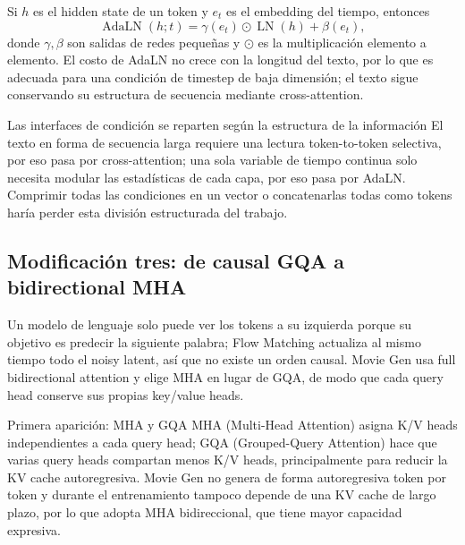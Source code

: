 
Si $h$ es el hidden state de un token y $e_t$ es el embedding del tiempo, entonces
\[
\operatorname{AdaLN}(h;t)
=\gamma(e_t)\odot\operatorname{LN}(h)+\beta(e_t),
\]
donde $\gamma,\beta$ son salidas de redes pequeñas y $\odot$ es la multiplicación elemento a elemento. El costo de AdaLN no crece con la longitud del texto, por lo que es adecuada para una condición de timestep de baja dimensión; el texto sigue conservando su estructura de secuencia mediante cross-attention.

\begin{importantbox}{Las interfaces de condición se reparten según la estructura de la información}
El texto en forma de secuencia larga requiere una lectura token-to-token selectiva, por eso pasa por cross-attention; una sola variable de tiempo continua solo necesita modular las estadísticas de cada capa, por eso pasa por AdaLN. Comprimir todas las condiciones en un vector o concatenarlas todas como tokens haría perder esta división estructurada del trabajo.
\end{importantbox}

\subsection{Modificación tres: de causal GQA a bidirectional MHA}

Un modelo de lenguaje solo puede ver los tokens a su izquierda porque su objetivo es predecir la siguiente palabra; Flow Matching actualiza al mismo tiempo todo el noisy latent, así que no existe un orden causal. Movie Gen usa full bidirectional attention y elige MHA en lugar de GQA, de modo que cada query head conserve sus propias key/value heads.


\begin{knowledgebox}{Primera aparición: MHA y GQA}
MHA (Multi-Head Attention) asigna K/V heads independientes a cada query head; GQA (Grouped-Query Attention) hace que varias query heads compartan menos K/V heads, principalmente para reducir la KV cache autoregresiva. Movie Gen no genera de forma autoregresiva token por token y durante el entrenamiento tampoco depende de una KV cache de largo plazo, por lo que adopta MHA bidireccional, que tiene mayor capacidad expresiva.
\end{knowledgebox}

